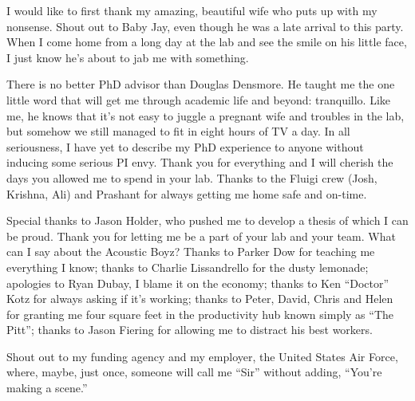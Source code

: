 I would like to first thank my amazing, beautiful wife who puts up with my nonsense. Shout out to Baby Jay, even though he was a late arrival to this party. When I come home from a long day at the lab and see the smile on his little face, I just know he's about to jab me with something.

There is no better PhD advisor than Douglas Densmore. He taught me the one little word that will get me through academic life and beyond: tranquillo. Like me, he knows that it's not easy to juggle a pregnant wife and troubles in the lab, but somehow we still managed to fit in eight hours of TV a day. In all seriousness, I have yet to describe my PhD experience to anyone without inducing some serious PI envy. Thank you for everything and I will cherish the days you allowed me to spend in your lab. Thanks to the Fluigi crew (Josh, Krishna, Ali) and Prashant for always getting me home safe and on-time.


Special thanks to Jason Holder, who pushed me to develop a thesis of which I can be proud. Thank you for letting me be a part of your lab and your team. What can I say about the Acoustic Boyz? Thanks to Parker Dow for teaching me everything I know; thanks to Charlie Lissandrello for the dusty lemonade; apologies to Ryan Dubay, I blame it on the economy; thanks to Ken ``Doctor'' Kotz for always asking if it's working; thanks to Peter, David, Chris and Helen for granting me four square feet in the productivity hub known simply as ``The Pitt''; thanks to Jason Fiering for allowing me to distract his best workers.

Shout out to my funding agency and my employer, the United States Air Force, where, maybe, just once, someone will call me ``Sir'' without adding, ``You're making a scene.''
